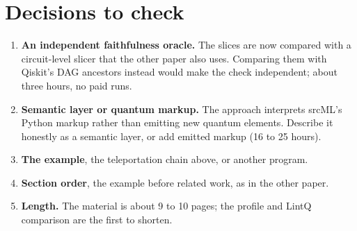 \documentclass[10pt]{article}
\begin{document}
\section*{Decisions to check}
\begin{enumerate}[label=(\roman*)]
\item \textbf{An independent faithfulness oracle.} The slices are now compared with a circuit-level slicer that the other
paper also uses. Comparing them with Qiskit's DAG ancestors instead would make the check independent; about three hours,
no paid runs.
\item \textbf{Semantic layer or quantum markup.} The approach interprets srcML's Python markup rather than emitting new
quantum elements. Describe it honestly as a semantic layer, or add emitted markup (16 to 25 hours).
\item \textbf{The example}, the teleportation chain above, or another program.
\item \textbf{Section order}, the example before related work, as in the other paper.
\item \textbf{Length.} The material is about 9 to 10 pages; the profile and LintQ comparison are the first to shorten.
\end{enumerate}
\end{document}
